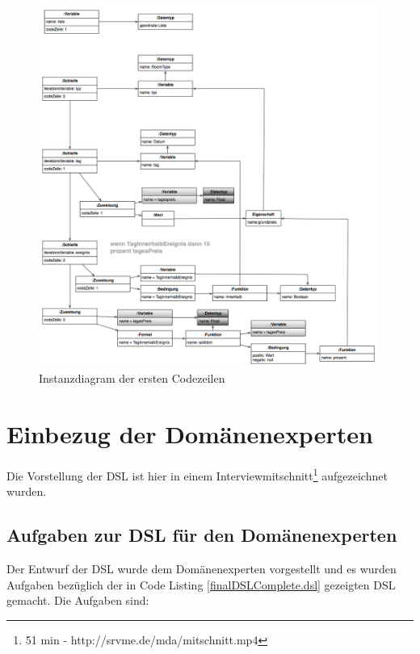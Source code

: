 \documentclass[11pt,english,ngerman, headsepline]{scrreprt}
\begin{document}
\begin{figure}[h!]
	\begin{center}
	\includegraphics[width=0.99\textwidth]{pics/mmInstanz}
	\end{center}
	\caption{Instanzdiagram der ersten Codezeilen}
	\label{mmInstanz.png}
\end{figure}
 \clearpage
 
\chapter{Einbezug der Domänenexperten}

Die Vorstellung der DSL ist hier in einem Interviewmitschnitt\footnote{51 min -
http://srvme.de/mda/mitschnitt.mp4} aufgezeichnet wurden.


\section{Aufgaben zur DSL für den Domänenexperten}

Der Entwurf der DSL wurde dem Domänenexperten vorgestellt und es wurden
Aufgaben bezüglich der in Code Listing \ref{finalDSLComplete.dsl} gezeigten DSL gemacht.
Die Aufgaben sind:
\end{document}
